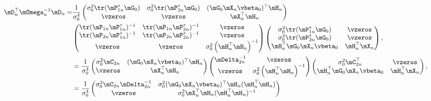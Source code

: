 \documentclass[english,12pt]{book}\usepackage[]{graphicx}\usepackage[]{xcolor}
\begin{document}
\begin{equation*}
\begin{aligned}
 \mD_n^\top\mOmega_n^{-1}\mD_n = &   \frac{1}{\sigma_0^4}
 \begin{pmatrix}
  \sigma_0^2\tr(\mP^s_{1n}\mG_0) &  \sigma_0^2\tr(\mP^s_{2n}\mG_0) & (\mG_0\mX_n\vbeta_0)^\top\mH_n\\
 \vzeros & \vzeros & \mX_n^\top\mH_n
 \end{pmatrix}\\
 & 
           \begin{pmatrix}
          \tr(\mP_{1n}\mP_{1n}^s)^{-1} & \tr(\mP_{1n}\mP_{2n}^s)^{-1} & \vzeros \\
          \tr(\mP_{2n}\mP_{1n}^s)^{-1} & \tr(\mP_{2n}\mP_{2n}^s)^{-1} & \vzeros \\
          \vzeros & \vzeros & \sigma_0^2\left(\mH_n^{\top}\mH_n\right)^{-1}
          \end{pmatrix} 
         \begin{pmatrix}
           \sigma_0^2\tr(\mP^s_{1n}\mG_0) & \vzeros \\
           \sigma_0^2\tr(\mP^s_{2n}\mG_0) & \vzeros \\
           \mH_n^\top\mG_0\mX_n\vbeta_0 & \mH^\top_n\mX_n
         \end{pmatrix}, \\
         & = \frac{1}{\sigma_0^4}
         \begin{pmatrix}
         \sigma_0^2\mC_{2n} & (\mG_0\mX_n\vbeta_0)^\top\mH_n \\
         \vzeros & \mX_n^\top\mH_n
         \end{pmatrix}
         \begin{pmatrix}
          \mDelta_{2n}^{-1} & \vzeros \\
          \vzeros & \sigma_0^2\left(\mH_n^\top\mH_n\right)^{-1}
         \end{pmatrix}
         \begin{pmatrix}
          \sigma_0^2\mC_{2n}^\top & \vzeros \\
          \mH_n^\top\mG_0\mX_n\vbeta_0 & \mH^\top_n\mX_n
         \end{pmatrix}, \\
        &  = \frac{1}{\sigma_0^4}
         \begin{pmatrix}
          \sigma_0^2\mC_{2n}\mDelta_{2n}^{-1} & \sigma_0^2(\mG_0\mX_n\vbeta_0)^\top\mH_n(\mH_n^\top\mH_n) \\
          \vzeros & \sigma_0^2\mX_n^\top\mH_n(\mH_n^\top\mH_n)^{-1}
         \end{pmatrix}

\end{aligned}
\end{equation*}
\end{document}
